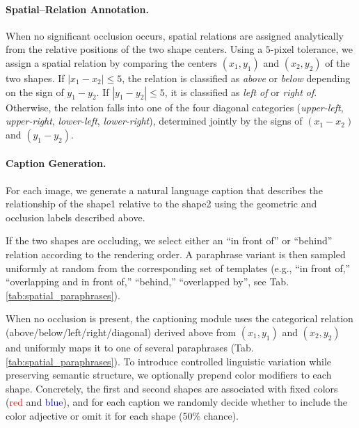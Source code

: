\documentclass[10pt,twocolumn,letterpaper]{article}
\begin{document}
\paragraph{Spatial–Relation Annotation.}
When no significant occlusion occurs, spatial relations are assigned analytically from the relative positions of the two shape centers. %
Using a $5$-pixel tolerance, we assign a spatial relation by comparing the centers $(x_1,y_1)$ and $(x_2,y_2)$ of the two shapes. If $|x_1 - x_2| \le 5$, the relation is classified as \emph{above} or \emph{below} depending on the sign of $y_1 - y_2$. If $|y_1 - y_2| \le 5$, it is classified as \emph{left of} or \emph{right of}. Otherwise, the relation falls into one of the four diagonal categories (\emph{upper-left}, \emph{upper-right}, \emph{lower-left}, \emph{lower-right}), determined jointly by the signs of $(x_1 - x_2)$ and $(y_1 - y_2)$.

\paragraph{Caption Generation.}
For each image, we generate a natural language caption that describes the relationship of the shape1 relative to the shape2 using the geometric and occlusion labels described above. 

If the two shapes are occluding, we select either an ``in front of'' or ``behind'' relation according to the rendering order. A paraphrase variant is then sampled uniformly at random from the corresponding set of templates (e.g., ``in front of,'' ``overlapping and in front of,'' ``behind,'' ``overlapped by'', see Tab.\ref{tab:spatial_paraphrases}).

When no occlusion is present, the captioning module uses the categorical relation (above/below/left/right/diagonal) derived above from $(x_1,y_1)$ and $(x_2,y_2)$ and uniformly maps it to one of several paraphrases (Tab. \ref{tab:spatial_paraphrases}). 
To introduce controlled linguistic variation while preserving semantic structure, we optionally prepend color modifiers to each shape. 
Concretely, the first and second shapes are associated with fixed colors (\textcolor{red}{red} and \textcolor{blue}{blue}), and for each caption we randomly decide whether to include the color adjective or omit it for each shape (50\% chance).
\end{document}
